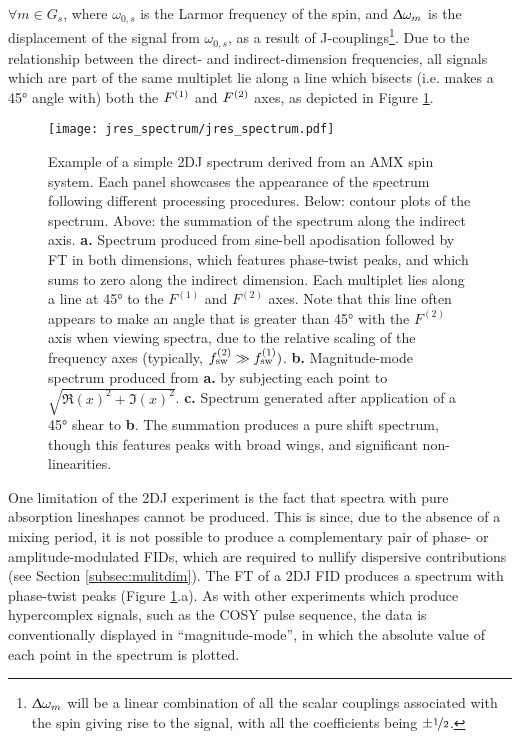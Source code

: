 $\forall m \in G_s$, where $\omega_{0,s}$ is the Larmor frequency of
the spin, and $\Updelta \omega_m$ is the displacement
of the signal from $\omega_{0,s}$, as a result of J-couplings\footnote{
    $\Updelta \omega_m$ will be a linear combination of all the scalar
    couplings associated with the spin giving rise to the signal, with all the
    coefficients being $\pm \nicefrac{1}{2}$.
}. Due to the relationship between the direct- and indirect-dimension
frequencies, all signals which are part of the same multiplet lie along
a line which bisects (i.e. makes a \ang{45} angle with) both the $F^{(1)}$ and
$F^{(2)}$ axes, as depicted in Figure \ref{fig:jres_spectrum}.
\begin{figure}%
    \centering%
    \texttt{[image: jres\_spectrum/jres\_spectrum.pdf]}%
    \caption[
        Example of a simple \acs{2DJ} spectra derived from an AMX spin system,
        processes in different ways.
    ]
    {%
        Example of a simple \acs{2DJ} spectrum derived from an AMX spin system.
        Each panel showcases the appearance of the spectrum following different
        processing procedures. Below: contour plots of the spectrum. Above: the
        summation of the spectrum along the indirect axis.
        \textbf{a.} Spectrum produced from sine-bell apodisation followed by
        \ac{FT} in both dimensions, which features phase-twist peaks, and which
        sums to zero along the indirect dimension. Each multiplet lies along a
        line at \ang{45} to the $F^{(1)}$ and $F^{(2)}$ axes. Note that this
        line often appears to make an angle that is greater than \ang{45} with
        the $F^{(2)}$ axis when viewing spectra, due to the relative scaling of
        the frequency axes (typically, $f_{\mathrm{sw}}^{(2)} \gg f_{\mathrm{sw}}^{(1)})$.
        \textbf{b.} Magnitude-mode spectrum produced from \textbf{a.} by
        subjecting each point to $\sqrt{\Re(x)^2 + \Im(x)^2}$.
        \textbf{c.} Spectrum generated after application of a \ang{45} shear to
        \textbf{b}.  The summation produces a pure shift spectrum, though this
        features peaks with broad wings, and significant non-linearities.
   }%
    \label{fig:jres_spectrum}%
\end{figure}%
One limitation of the \ac{2DJ} experiment is the fact that
spectra with pure absorption lineshapes cannot be produced. This is since, due
to the absence of a mixing period, it is not possible to produce a
complementary pair of phase- or amplitude-modulated \acp{FID}, which are
required to nullify dispersive contributions (see Section
\ref{subsec:mulitdim}).
The FT of a \ac{2DJ} \ac{FID} produces a spectrum with phase-twist
peaks (Figure \ref{fig:jres_spectrum}.a). As with other experiments which
produce hypercomplex signals, such as the \ac{COSY} pulse sequence, the data is
conventionally displayed in ``magnitude-mode'', in which the absolute value of
each point in the spectrum is plotted.

